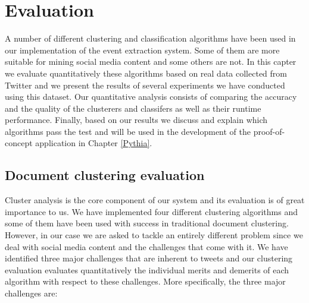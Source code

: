\chapter{Evaluation}\label{Evaluation}
\ifpdf
    \graphicspath{{Chapter4/Chapter4Figs/PNG/}{Chapter4/Chapter4Figs/PDF/}{Chapter4/Chapter4Figs/}}
\else
    \graphicspath{{Chapter4/Chapter4Figs/EPS/}{Chapter4/Chapter4Figs/}}
\fi
A number of different clustering and classification algorithms have been used in our implementation of the event extraction system. 
Some of them are more suitable for mining social media content and some others are not. In this capter we evaluate quantitatively these algorithms 
based on real data collected from Twitter and we present the results of several experiments we have conducted using this dataset. 
Our quantitative analysis consists of comparing the accuracy and the quality of the clusterers and classifers as well as their runtime performance. 
Finally, based on our results we discuss and explain which algorithms pass the test and will be used in the development of the proof-of-concept application in Chapter \ref{Pythia}.

\section{Document clustering evaluation}
Cluster analysis is the core component of our system and its evaluation is of great importance to us. We have implemented 
four different clustering algorithms and some of them have been used with success in traditional document clustering. However,
in our case we are asked to tackle an entirely different problem since we deal with social media content and the challenges that come with it. 
We have identified three major challenges that are inherent to tweets and our clustering evaluation evaluates quantitatively the individual merits and demerits 
of each algorithm with respect to these challenges. More specifically, the three major challenges are:

